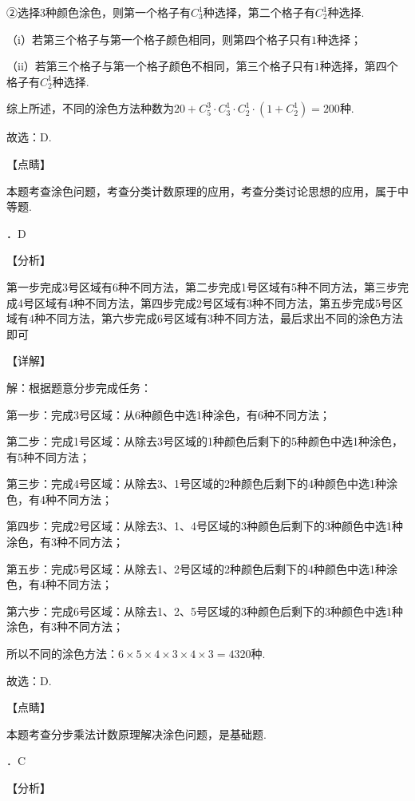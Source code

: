 \documentclass[a4paper,11pt,UTF8,twoside]{ctexart} %
\begin{document}
\noindent ②选择$3$种颜色涂色，则第一个格子有$C_{3}^{1} $种选择，第二个格子有$C_{2}^{1} $种选择.

\noindent （i）若第三个格子与第一个格子颜色相同，则第四个格子只有$1$种选择；

\noindent （ii）若第三个格子与第一个格子颜色不相同，第三个格子只有$1$种选择，第四个格子有$C_{2}^{1} $种选择.

\noindent 综上所述，不同的涂色方法种数为$20+C_{5}^{3} \cdot C_{3}^{1} \cdot C_{2}^{1} \cdot \left(1+C_{2}^{1} \right)=200$种.

\noindent 故选：D.

\noindent 【点睛】

\noindent 本题考查涂色问题，考查分类计数原理的应用，考查分类讨论思想的应用，属于中等题.

．D

\noindent 【分析】

\noindent 第一步完成3号区域有6种不同方法，第二步完成1号区域有5种不同方法，第三步完成4号区域有4种不同方法，第四步完成2号区域有3种不同方法，第五步完成5号区域有4种不同方法，第六步完成6号区域有3种不同方法，最后求出不同的涂色方法即可

\noindent 【详解】

\noindent 解：根据题意分步完成任务：

\noindent 第一步：完成3号区域：从6种颜色中选1种涂色，有6种不同方法；

\noindent 第二步：完成1号区域：从除去3号区域的1种颜色后剩下的5种颜色中选1种涂色，有5种不同方法；

\noindent 第三步：完成4号区域：从除去3、1号区域的2种颜色后剩下的4种颜色中选1种涂色，有4种不同方法；

\noindent 第四步：完成2号区域：从除去3、1、4号区域的3种颜色后剩下的3种颜色中选1种涂色，有3种不同方法；

\noindent 第五步：完成5号区域：从除去1、2号区域的2种颜色后剩下的4种颜色中选1种涂色，有4种不同方法；

\noindent 第六步：完成6号区域：从除去1、2、5号区域的3种颜色后剩下的3种颜色中选1种涂色，有3种不同方法；

\noindent 所以不同的涂色方法：$6\times 5\times 4\times 3\times 4\times 3=4320$种.

\noindent 故选：D.

\noindent 【点睛】

\noindent 本题考查分步乘法计数原理解决涂色问题，是基础题.

．C

\noindent 【分析】
\end{document}
